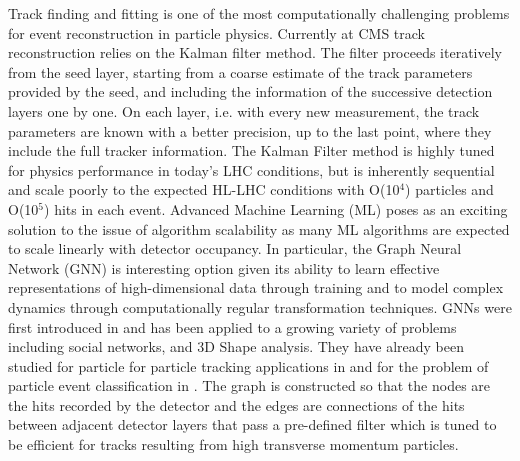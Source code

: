 \documentclass[preprint,12pt]{elsarticle}
\begin{document}
Track finding and fitting is one of the most computationally challenging 
problems for event reconstruction in particle physics.
Currently at CMS track reconstruction relies on the Kalman filter method. 
The filter proceeds iteratively from the seed layer, starting from a coarse estimate of 
the track parameters provided by the seed, and including the
information of the successive detection layers one by one. 
On each layer, i.e. with every new measurement, the track parameters 
are known with a better precision, up to the last point, where they 
include the full tracker information.
The Kalman Filter method is highly tuned for physics performance in today’s LHC 
conditions, but is inherently sequential and scale poorly to the 
expected HL-LHC conditions with O(10$^{4}$) particles and O(10$^{5}$) hits 
in each event. %
Advanced Machine Learning (ML) poses as an exciting solution to the issue of 
algorithm scalability as many ML algorithms are expected to scale linearly %
with detector occupancy.
In particular, the Graph Neural Network (GNN) is interesting option
given its ability to learn effective representations of high-dimensional data 
through training and to model complex dynamics through computationally regular 
transformation techniques.
GNNs were first introduced in \cite{GNN_first}
and has been applied to a growing variety of problems including social networks,
and 3D Shape analysis. They have already been studied for particle for particle tracking
applications in \cite{GNN_particletracking1,GNN_particletracking2} and for the problem
of particle event classification in \cite{GNN_ec_1, GNN_ec_2, GNN_ec_3}.
The graph is constructed so that the nodes are the hits recorded by the detector and the 
edges are connections of the hits between adjacent detector layers that pass a pre-defined
filter which is tuned to be efficient for tracks resulting from high transverse momentum
particles. 

\end{document}
